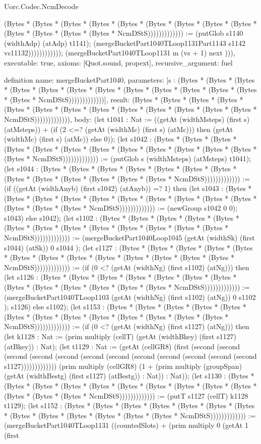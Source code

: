 \begin{lexlean}{Uorc.Codec.NcmDecode}
\begin{semanticmodule}
{(Bytes * (Bytes * (Bytes * (Bytes * (Bytes * (Bytes * (Bytes * (Bytes * (Bytes * (Bytes * (Bytes * (Bytes * (Bytes * NcmDStS))))))))))))) := (putGlob s1140 (widthAdp) (atAdp) t1141); (mergeBucketPart1040TLoop1131Part1143 s1142 vs11132)))))))))))); (mergeBucketPart1040TLoop1131 m (vs + 1) next ))),
  executable: true,
  axioms: [Quot.sound, propext],
  recursive_argument: fuel
}

definition{
  name: mergeBucketPart1040,
  parameters: [s : (Bytes * (Bytes * (Bytes * (Bytes * (Bytes * (Bytes * (Bytes * (Bytes * (Bytes * (Bytes * (Bytes * (Bytes * (Bytes * NcmDStS)))))))))))))],
  result: (Bytes * (Bytes * (Bytes * (Bytes * (Bytes * (Bytes * (Bytes * (Bytes * (Bytes * (Bytes * (Bytes * (Bytes * (Bytes * NcmDStS))))))))))))),
  body: (let t1041 : Nat := ((getAt (widthMsteps) (first s) (atMsteps)) + (if (2 <=? (getAt (widthMc) (first s) (atMc))) then (getAt (widthMc) (first s) (atMc)) else 0)); (let s1042 : (Bytes * (Bytes * (Bytes * (Bytes * (Bytes * (Bytes * (Bytes * (Bytes * (Bytes * (Bytes * (Bytes * (Bytes * (Bytes * NcmDStS))))))))))))) := (putGlob s (widthMsteps) (atMsteps) t1041); (let s1044 : (Bytes * (Bytes * (Bytes * (Bytes * (Bytes * (Bytes * (Bytes * (Bytes * (Bytes * (Bytes * (Bytes * (Bytes * (Bytes * NcmDStS))))))))))))) := (if ((getAt (widthAnyb) (first s1042) (atAnyb)) =? 1) then (let s1043 : (Bytes * (Bytes * (Bytes * (Bytes * (Bytes * (Bytes * (Bytes * (Bytes * (Bytes * (Bytes * (Bytes * (Bytes * (Bytes * NcmDStS))))))))))))) := (newGroup s1042 0 0); s1043) else s1042); (let s1102 : (Bytes * (Bytes * (Bytes * (Bytes * (Bytes * (Bytes * (Bytes * (Bytes * (Bytes * (Bytes * (Bytes * (Bytes * (Bytes * NcmDStS))))))))))))) := (mergeBucketPart1040Loop1045 (getAt (widthSk) (first s1044) (atSk)) 0 s1044 ); (let s1127 : (Bytes * (Bytes * (Bytes * (Bytes * (Bytes * (Bytes * (Bytes * (Bytes * (Bytes * (Bytes * (Bytes * (Bytes * (Bytes * NcmDStS))))))))))))) := (if (0 <? (getAt (widthNg) (first s1102) (atNg))) then (let s1126 : (Bytes * (Bytes * (Bytes * (Bytes * (Bytes * (Bytes * (Bytes * (Bytes * (Bytes * (Bytes * (Bytes * (Bytes * (Bytes * NcmDStS))))))))))))) := (mergeBucketPart1040TLoop1103 (getAt (widthNg) (first s1102) (atNg)) 0 s1102 ); s1126) else s1102); (let s1153 : (Bytes * (Bytes * (Bytes * (Bytes * (Bytes * (Bytes * (Bytes * (Bytes * (Bytes * (Bytes * (Bytes * (Bytes * (Bytes * NcmDStS))))))))))))) := (if (0 <? (getAt (widthNg) (first s1127) (atNg))) then (let k1128 : Nat := (prim multiply (cellT) (getAt (widthBkey) (first s1127) (atBkey)) : Nat); (let t1129 : Nat := (getAt (cellGR8) (first (second (second (second (second (second (second (second (second (second (second (second (second s1127))))))))))))) (prim multiply (cellGR8) (1 + (prim multiply (groupSpan) (getAt (widthBestg) (first s1127) (atBestg)) : Nat)) : Nat)); (let s1130 : (Bytes * (Bytes * (Bytes * (Bytes * (Bytes * (Bytes * (Bytes * (Bytes * (Bytes * (Bytes * (Bytes * (Bytes * (Bytes * NcmDStS))))))))))))) := (putT s1127 (cellT) k1128 t1129); (let s1152 : (Bytes * (Bytes * (Bytes * (Bytes * (Bytes * (Bytes * (Bytes * (Bytes * (Bytes * (Bytes * (Bytes * (Bytes * (Bytes * NcmDStS))))))))))))) := (mergeBucketPart1040TLoop1131 ((countedSlots) + (prim multiply 0 (getAt 1 (first }
\end{semanticmodule}
\end{lexlean}
